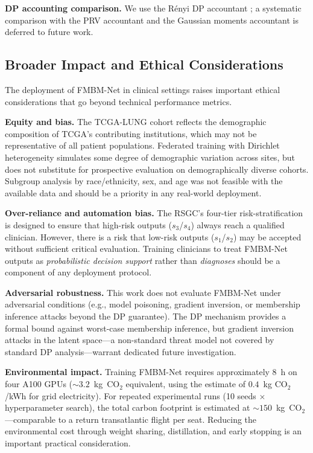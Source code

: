 \documentclass[a4paper,fleqn]{cas-dc}
\begin{document}
\textbf{DP accounting comparison.} We use the R\'{e}nyi DP
accountant \citep{mironov2017renyi}; a systematic comparison with the PRV
accountant \citep{gopi2021prv} and the Gaussian moments accountant is deferred
to future work.

\subsection{Broader Impact and Ethical Considerations}

The deployment of FMBM-Net in clinical settings raises important ethical
considerations that go beyond technical performance metrics.

\textbf{Equity and bias.}
The TCGA-LUNG cohort reflects the demographic composition of TCGA's
contributing institutions, which may not be representative of all patient
populations. Federated training with Dirichlet heterogeneity simulates
some degree of demographic variation across sites, but does not substitute
for prospective evaluation on demographically diverse cohorts. Subgroup
analysis by race/ethnicity, sex, and age was not feasible with the available
data and should be a priority in any real-world deployment.

\textbf{Over-reliance and automation bias.}
The RSGC's four-tier risk-stratification is designed to ensure that
high-risk outputs ($s_3$/$s_4$) always reach a qualified clinician.
However, there is a risk that low-risk outputs ($s_1$/$s_2$) may be accepted
without sufficient critical evaluation. Training clinicians to treat FMBM-Net
outputs as \emph{probabilistic decision support} rather than \emph{diagnoses}
should be a component of any deployment protocol.

\textbf{Adversarial robustness.}
This work does not evaluate FMBM-Net under adversarial conditions
(e.g., model poisoning, gradient inversion, or membership inference attacks
beyond the DP guarantee). The DP mechanism provides a formal bound against
worst-case membership inference, but gradient inversion attacks in the latent
space---a non-standard threat model not covered by standard DP
analysis---warrant dedicated future investigation.

\textbf{Environmental impact.}
Training FMBM-Net requires approximately $8$~h on four A100 GPUs
($\sim\!3.2$~kg~CO$_2$ equivalent, using the estimate of
$0.4$~kg CO$_2$/kWh for grid electricity). For repeated experimental runs
(10 seeds $\times$ hyperparameter search), the total carbon footprint is
estimated at $\sim\!150$~kg~CO$_2$---comparable to a return transatlantic
flight per seat. Reducing the environmental cost through weight sharing,
distillation, and early stopping is an important practical consideration.
\end{document}
